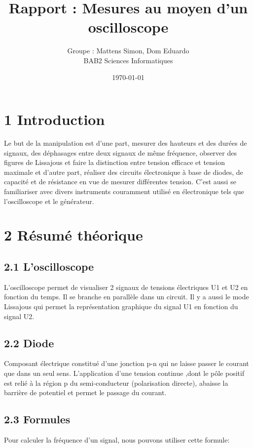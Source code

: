 \documentclass{report}
\author{Groupe : Mattens Simon, Dom Eduardo \\ BAB2 Sciences Informatiques}
\title{Rapport : Mesures au moyen d'un oscilloscope}
\date{\today}
\makeatletter
\def\maketitle{%
  \null
  \thispagestyle{empty}%
  \vfill
  \begin{center}\leavevmode
    \normalfont
    {\LARGE \@title\par}%
    \vskip 1cm
    {\Large \@author\par}%
    \vskip 1cm
    {\Large \@date\par}%
  \end{center}%
  \vfill
  \null
  \newpage
  }
\makeatother
\begin{document}
\maketitle

\section*{1 Introduction}
\hspace*{0.5cm}
Le but de la manipulation est 
d'une part, mesurer des hauteurs et des dur\'ees de signaux, des d\'ephasages entre deux signaux de m\^eme fr\'equence, observer des figures de Lissajous et faire la distinction entre tension efficace et tension maximale et d'autre part, r\'ealiser des circuits \'electronique \`a base de diodes, de capacit\'e et de r\'esistance en vue de mesurer diff\'erentes tension. C'est aussi se familiariser avec divers instruments couramment utilis\'e en \'electronique tels que l'oscilloscope et le g\'en\'erateur.

\section*{2 R\'esum\'e th\'eorique}
\subsection*{2.1 L'oscilloscope}
\hspace*{0.5cm}
L'oscilloscope permet de visualiser 2 signaux de tensions \'electriques U1 et U2 en fonction du temps. Il se branche en parall\`ele dans un circuit. Il y a aussi le mode Lissajous qui permet la repr\'esentation graphique du signal U1 en fonction du signal U2.
\subsection*{2.2 Diode}
\hspace*{0.5cm}
Composant \'electrique constitu\'e d'une jonction p-n qui ne laisse passer le courant que dans un seul sens. L'application d'une tension continue ,dont le p\^ole positif est reli\'e \`a la r\'egion p du semi-conducteur (polarisation directe), abaisse la barri\`ere de potentiel et permet le passage du courant.
\subsection*{2.3 Formules}
\hspace*{0.5cm}
Pour calculer la fr\'equence d'un signal, nous pouvons utiliser cette formule:
\end{document}
